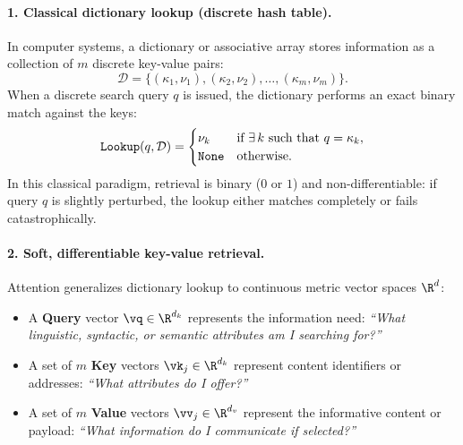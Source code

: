 \documentclass[../../main.tex]{subfiles}
\begin{document}
\paragraph{1. Classical dictionary lookup (discrete hash table).}
In computer systems, a dictionary or associative array stores information as a collection of $m$ discrete key-value pairs:
\begin{equation}
\mathcal{D} = \{ (\kappa_1, \nu_1), (\kappa_2, \nu_2), \dots, (\kappa_m, \nu_m) \}.
\end{equation}
When a discrete search query $q$ is issued, the dictionary performs an exact binary match against the keys:
\begin{equation}
\label{eq:discrete_lookup}
\text{\texttt{Lookup}}(q, \mathcal{D}) = \begin{cases}
\nu_k & \text{if } \exists\, k \text{ such that } q = \kappa_k, \\
\text{\texttt{None}} & \text{otherwise}.
\end{cases}
\end{equation}
In this classical paradigm, retrieval is binary ($0$ or $1$) and non-differentiable: if query $q$ is slightly perturbed, the lookup either matches completely or fails catastrophically.

\paragraph{2. Soft, differentiable key-value retrieval.}
Attention generalizes dictionary lookup to continuous metric vector spaces $\R^d$:
\begin{itemize}
    \item A \textbf{Query} vector $\vq \in \R^{d_k}$ represents the information need: \emph{``What linguistic, syntactic, or semantic attributes am I searching for?''}
    \item A set of $m$ \textbf{Key} vectors $\vk_j \in \R^{d_k}$ represent content identifiers or addresses: \emph{``What attributes do I offer?''}
    \item A set of $m$ \textbf{Value} vectors $\vv_j \in \R^{d_v}$ represent the informative content or payload: \emph{``What information do I communicate if selected?''}
\end{itemize}
\end{document}
